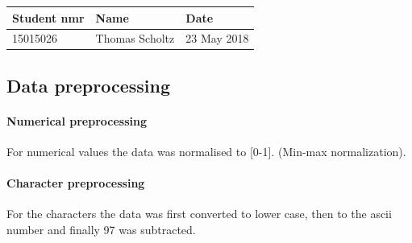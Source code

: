 \documentclass[11pt]{article}
\begin{document}
\begin{longtable}[]{@{}lll@{}}
\toprule
Student nmr & Name & Date\tabularnewline
\midrule
\endhead
15015026 & Thomas Scholtz & 23 May 2018\tabularnewline
\bottomrule
\end{longtable}

    \hypertarget{data-preprocessing}{%
\subsection{Data preprocessing}\label{data-preprocessing}}

\hypertarget{numerical-preprocessing}{%
\paragraph{Numerical preprocessing}\label{numerical-preprocessing}}

For numerical values the data was normalised to {[}0-1{]}. (Min-max
normalization).

\hypertarget{character-preprocessing}{%
\paragraph{Character preprocessing}\label{character-preprocessing}}

For the characters the data was first converted to lower case, then to
the ascii number and finally 97 was subtracted.
\end{document}
